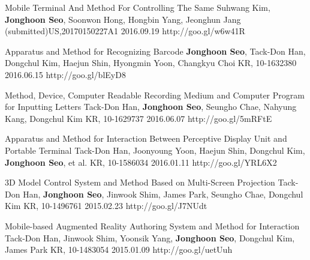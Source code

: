 \begin{cventries}
  \cvpatententry
    {Mobile Terminal And Method For Controlling The Same} %
    {Suhwang Kim, \textbf{Jonghoon Seo}, Soonwon Hong, Hongbin Yang, Jeonghun Jang} %
    {(submitted)US,20170150227A1} %
    {2016.09.19} %
    {http://goo.gl/w6w41R}

  \cvpatententry
    {Apparatus and Method for Recognizing Barcode} %
    {\textbf{Jonghoon Seo}, Tack-Don Han, Dongchul Kim, Haejun Shin, Hyongmin Yoon, Changkyu Choi} %
    {KR, 10-1632380} %
    {2016.06.15} %
    {http://goo.gl/blEyD8}

  \cvpatententry
    {Method, Device, Computer Readable Recording Medium and Computer Program for Inputting Letters} %
    {Tack-Don Han, \textbf{Jonghoon Seo}, Seungho Chae, Nahyung Kang, Dongchul Kim} %
    {KR, 10-1629737} %
    {2016.06.07} %
    {http://goo.gl/5mRFtE}

  \cvpatententry
    {Apparatus and Method for Interaction Between Perceptive Display Unit and Portable Terminal} %
    {Tack-Don Han, Joonyoung Yoon, Haejun Shin, Dongchul Kim, \textbf{Jonghoon Seo}, et al.} %
    {KR, 10-1586034} %
    {2016.01.11} %
    {http://goo.gl/YRL6X2}

  \cvpatententry
    {3D Model Control System and Method Based on Multi-Screen Projection} %
    {Tack-Don Han, \textbf{Jonghoon Seo}, Jinwook Shim, James Park, Seungho Chae, Dongchul Kim} %
    {KR, 10-1496761} %
    {2015.02.23} %
    {http://goo.gl/J7NUdt}

  \cvpatententry
    {Mobile-based Augmented Reality Authoring System and Method for Interaction} %
    {Tack-Don Han, Jinwook Shim, Yoonsik Yang, \textbf{Jonghoon Seo}, Dongchul Kim, James Park} %
    {KR, 10-1483054} %
    {2015.01.09} %
    {http://goo.gl/uetUuh}


\end{cventries}
